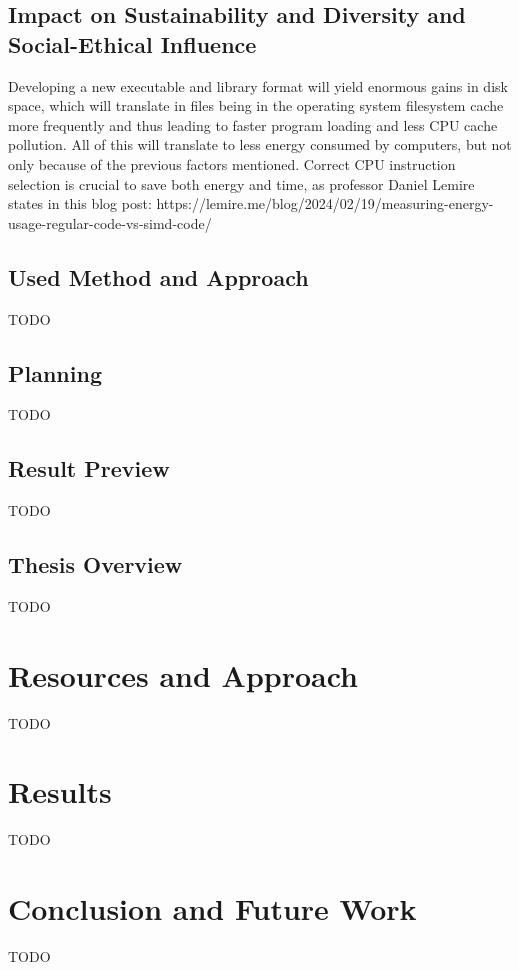 \documentclass[12pt]{article}
\begin{document}
	\subsection{Impact on Sustainability and Diversity and Social-Ethical Influence}
    Developing a new executable and library format will yield enormous gains in disk space, which will translate in files being in the operating system filesystem cache more frequently and thus leading to faster program loading and less CPU cache pollution. All of this will translate to less energy consumed by computers, but not only because of the previous factors mentioned. Correct CPU instruction selection is crucial to save both energy and time, as professor Daniel Lemire states in this blog post: https://lemire.me/blog/2024/02/19/measuring-energy-usage-regular-code-vs-simd-code/
	\subsection{Used Method and Approach}
    TODO
	\subsection{Planning}
	TODO
	\subsection{Result Preview}
	TODO
	\subsection{Thesis Overview}
	TODO	
	\section{Resources and Approach}
	TODO
	\section{Results}
	TODO
	\section{Conclusion and Future Work}
	TODO

\end{document}
